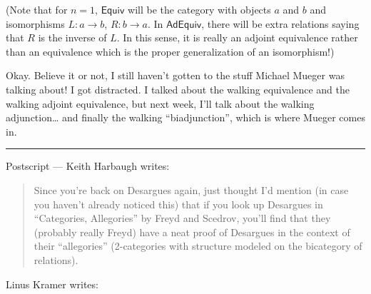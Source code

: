 \documentclass{article}
\begin{document}
(Note that for \(n = 1\), \(\mathsf{Equiv}\) will be the category with
objects \(a\) and \(b\) and isomorphisms \(L\colon a \to b\),
\(R\colon b \to a\). In \(\mathsf{AdEquiv}\), there will be extra
relations saying that \(R\) is the inverse of \(L\). In this sense, it
is really an adjoint equivalence rather than an equivalence which is the
proper generalization of an isomorphism!)

Okay. Believe it or not, I still haven't gotten to the stuff Michael
Mueger was talking about! I got distracted. I talked about the walking
equivalence and the walking adjoint equivalence, but next week, I'll
talk about the walking adjunction\ldots{} and finally the walking
``biadjunction'', which is where Mueger comes in.

\begin{center}\rule{0.5\linewidth}{0.5pt}\end{center}

Postscript --- Keith Harbaugh writes:

\begin{quote}
Since you're back on Desargues again, just thought I'd mention (in case
you haven't already noticed this) that if you look up Desargues in
``Categories, Allegories'' by Freyd and Scedrov, you'll find that they
(probably really Freyd) have a neat proof of Desargues in the context of
their ``allegories'' (2-categories with structure modeled on the
bicategory of relations).
\end{quote}

Linus Kramer writes:
\end{document}

